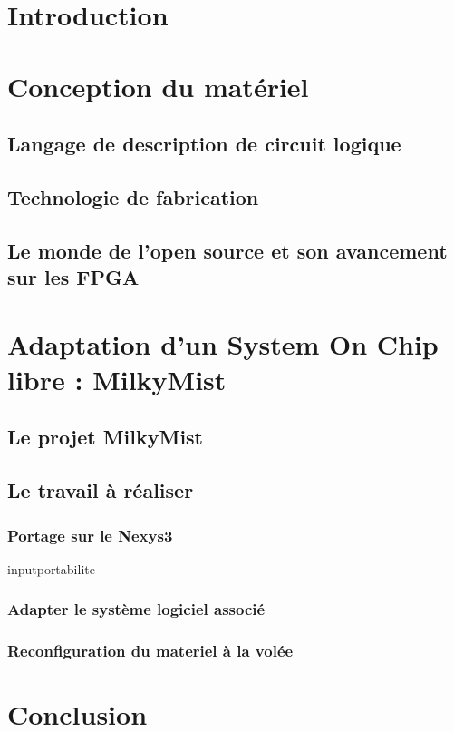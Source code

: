 \documentclass{report}
\begin{document}
\chapter*{Introduction} 


\chapter{Conception du matériel}

\section{Langage de description de circuit logique}  \newpage

\section{Technologie de fabrication} 

\section{Le monde de l'open source et son avancement sur les FPGA}
 \newpage

\chapter{Adaptation d'un System On Chip libre : MilkyMist} \newpage

\section{Le projet MilkyMist}  \newpage

\section{Le travail à réaliser}

\subsection{Portage sur le Nexys3}

input{portabilite} \newpage

\subsection{Adapter le système logiciel associé}

\newpage

\subsection{Reconfiguration du materiel à la volée}

\newpage

\chapter*{Conclusion}




\begin{ref}
    
\end{ref}
\end{document}
